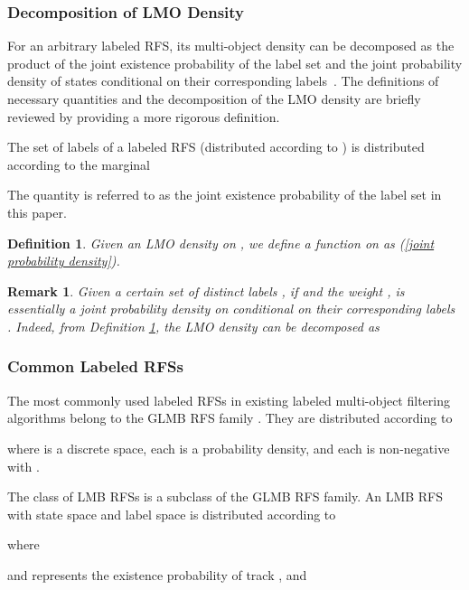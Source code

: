 \documentclass[journal]{IEEEtran}
\newtheorem{Def}{Definition}
\newtheorem{Rem}{Remark}
\begin{document}
\subsubsection{Decomposition of LMO Density}
For an arbitrary labeled RFS, its multi-object density can be decomposed as the product of the joint existence probability of the label set and the  joint probability density of states conditional on their corresponding labels~\cite{refr:label_6}. 
The definitions of necessary quantities  and the decomposition of the LMO density are briefly reviewed by providing a more rigorous  definition.

The set of labels  of a labeled RFS  (distributed according to ) is distributed according to the marginal

The quantity  is referred to as the joint existence probability of the label set  in this paper.
\begin{Def}\label{definition:1}
Given an LMO density  on , we define a function  on  as (\ref{joint probability density}).
\begin{figure*}

\hrulefill
\end{figure*}

\end{Def}
\begin{Rem}\label{remark:1}
Given a certain  set of distinct labels , if  and  the weight ,  is essentially a joint probability density on  conditional on their corresponding labels . Indeed, from Definition \ref{definition:1}, the LMO density  can be decomposed as 
 
\end{Rem}

\subsubsection{Common Labeled RFSs}
The most commonly used labeled RFSs in  existing labeled multi-object filtering algorithms belong to  the GLMB RFS family \cite{refr:label_1}  \cite{refr:label_2}. 
They are distributed according to 

where  is a discrete space, each  is a probability density, and each  is non-negative with .

The class of LMB RFSs is a  subclass of the GLMB RFS family. An  LMB RFS with state space  and label space  
is distributed according to \cite{refr:label_1,refr:label_2,refr:label_5}

where

and  represents the existence probability of track , and 
\end{document}
